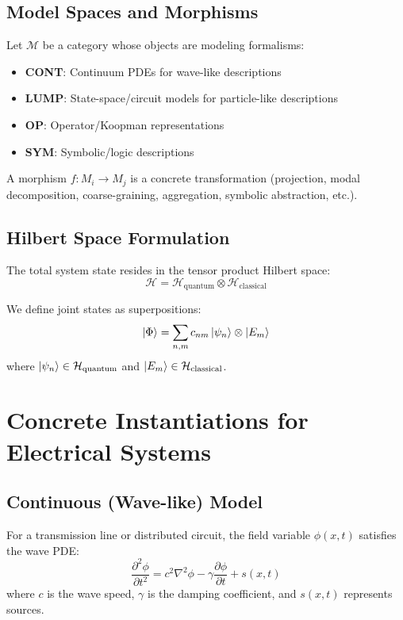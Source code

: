 \documentclass[11pt,a4paper]{article}
\begin{document}
\subsection{Model Spaces and Morphisms}

Let $\mathcal{M}$ be a category whose objects are modeling formalisms:
\begin{itemize}
    \item \textbf{CONT}: Continuum PDEs for wave-like descriptions
    \item \textbf{LUMP}: State-space/circuit models for particle-like descriptions
    \item \textbf{OP}: Operator/Koopman representations
    \item \textbf{SYM}: Symbolic/logic descriptions
\end{itemize}

A morphism $f: M_i \to M_j$ is a concrete transformation (projection, modal decomposition, coarse-graining, aggregation, symbolic abstraction, etc.).

\subsection{Hilbert Space Formulation}

The total system state resides in the tensor product Hilbert space:
\begin{equation}
\mathcal{H} = \mathcal{H}_{\text{quantum}} \otimes \mathcal{H}_{\text{classical}}
\end{equation}

We define joint states as superpositions:
\begin{equation}
\ket{\Phi} = \sum_{n,m} c_{nm} \ket{\psi_n} \otimes \ket{E_m}
\end{equation}
where $\ket{\psi_n} \in \mathcal{H}_{\text{quantum}}$ and $\ket{E_m} \in \mathcal{H}_{\text{classical}}$.

\section{Concrete Instantiations for Electrical Systems}
\label{sec:electrical_systems}

\subsection{Continuous (Wave-like) Model}

For a transmission line or distributed circuit, the field variable $\phi(x,t)$ satisfies the wave PDE:
\begin{equation}
\frac{\partial^2 \phi}{\partial t^2} = c^2 \nabla^2 \phi - \gamma \frac{\partial \phi}{\partial t} + s(x,t)
\end{equation}
where $c$ is the wave speed, $\gamma$ is the damping coefficient, and $s(x,t)$ represents sources.
\end{document}
